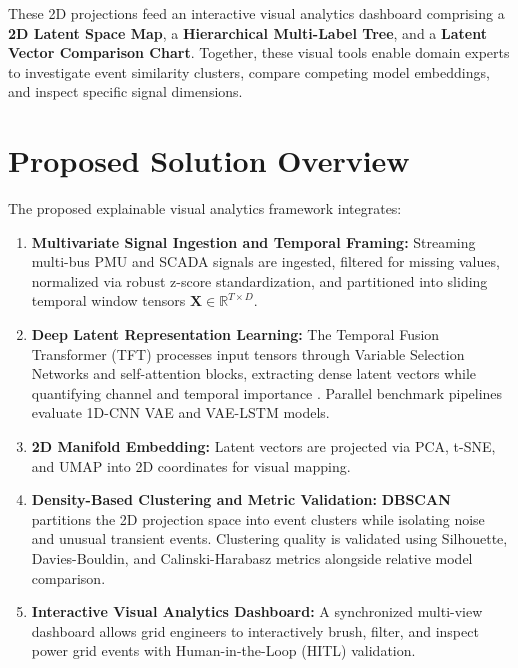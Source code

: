 \documentclass[12pt,a4paper]{report}
\begin{document}
These 2D projections feed an interactive visual analytics dashboard comprising a \textbf{2D Latent Space Map}, a \textbf{Hierarchical Multi-Label Tree}, and a \textbf{Latent Vector Comparison Chart}. Together, these visual tools enable domain experts to investigate event similarity clusters, compare competing model embeddings, and inspect specific signal dimensions.

\section{Proposed Solution Overview}
The proposed explainable visual analytics framework integrates:
\begin{enumerate}
    \item \textbf{Multivariate Signal Ingestion and Temporal Framing:} Streaming multi-bus PMU and SCADA signals are ingested, filtered for missing values, normalized via robust z-score standardization, and partitioned into sliding temporal window tensors $\mathbf{X} \in \mathbb{R}^{T \times D}$.
    \item \textbf{Deep Latent Representation Learning:} The Temporal Fusion Transformer (TFT) processes input tensors through Variable Selection Networks and self-attention blocks, extracting dense latent vectors while quantifying channel and temporal importance \cite{ref_lim2021_tft}. Parallel benchmark pipelines evaluate 1D-CNN VAE and VAE-LSTM models.
    \item \textbf{2D Manifold Embedding:} Latent vectors are projected via PCA, t-SNE, and UMAP into 2D coordinates for visual mapping.
    \item \textbf{Density-Based Clustering and Metric Validation:} \textbf{DBSCAN} partitions the 2D projection space into event clusters while isolating noise and unusual transient events. Clustering quality is validated using Silhouette, Davies-Bouldin, and Calinski-Harabasz metrics alongside relative model comparison.
    \item \textbf{Interactive Visual Analytics Dashboard:} A synchronized multi-view dashboard allows grid engineers to interactively brush, filter, and inspect power grid events with Human-in-the-Loop (HITL) validation.
\end{enumerate}
\end{document}
